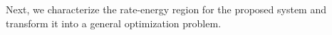 Next, we characterize the rate-energy region for the proposed system and transform it into a general optimization problem. 